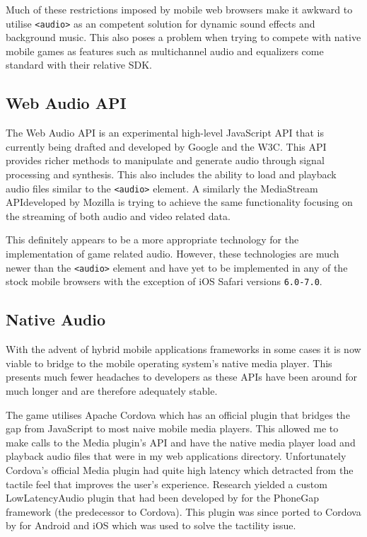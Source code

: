 \documentclass[final]{cmpreport}
\begin{document}
Much of these restrictions imposed by mobile web browsers make it awkward to utilise \texttt{<audio>} as an competent solution for dynamic sound effects and background music. This also poses a problem when trying to compete with native mobile games as features such as multichannel audio and equalizers come standard with their relative SDK.

\subsection{Web Audio API}
The Web Audio API is an experimental high-level JavaScript API that is currently being drafted and developed by Google and the W3C\footnotemark. This API provides richer methods to manipulate and generate audio through signal processing and synthesis. This also includes the ability to load and playback audio files similar to the \texttt{<audio>} element. A similarly the MediaStream API\footnotemark developed by Mozilla is trying to achieve the same functionality focusing on the streaming of both audio and video related data.


This definitely appears to be a more appropriate technology for the implementation of game related audio. However, these technologies are much newer than the \texttt{<audio>} element and have yet to be implemented in any of the stock mobile browsers with the exception of iOS Safari versions \texttt{6.0-7.0\footnotemark}.


\subsection{Native Audio}
With the advent of hybrid mobile applications frameworks in some cases it is now viable to bridge to the mobile operating system's native media player. This presents much fewer headaches to developers as these APIs have been around for much longer and are therefore adequately stable.

The game utilises Apache Cordova which has an official plugin that bridges the gap from JavaScript to most naive mobile media players. This allowed me to make calls to the Media plugin's API and have the native media player load and playback audio files that were in my web applications directory. Unfortunately Cordova's official Media plugin had quite high latency which detracted from the tactile feel that improves the user's experience. Research yielded a custom LowLatencyAudio plugin that had been developed by \citep{Trice} for the PhoneGap framework (the predecessor to Cordova). This plugin was since ported to Cordova by \citep{Xie} for Android and iOS which was used to solve the tactility issue.
\end{document}
